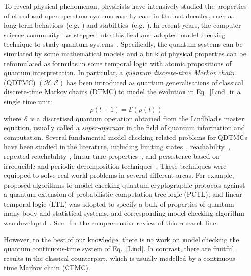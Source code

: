 \documentclass[a4paper,UKenglish,cleveref,autoref,thm-restate,authorcolumns]{lipics-v2019}
\newcommand{\h}{\mathcal{H}}
\newcommand{\e}{\mathrm{e}}
\renewcommand{\e}{\mathcal{E}}
\begin{document}
To reveal physical phenomenon,
physicists have intensively studied the properties of closed and open quantum systems
case by case in the last decades,
such as long-term behaviors~(e.g. \cite{GLT+10})
and stabilities~(e.g. \cite{CiT15}).
In recent years,
the computer science community has stepped into this field
and adopted model checking technique to study quantum systems~\cite{GNP06,GNP08}.
Specifically, the quantum systems can be simulated by some mathematical models
and a bulk of physical properties can be reformulated as formulas
in some temporal logic with atomic propositions of quantum interpretation.
In particular, a \emph{quantum discrete-time Markov chain} (QDTMC) $(\h,\e)$
has been introduced as quantum generalisations of classical discrete-time Markov chains (DTMC)
to model the evolution in Eq.~\eqref{Lind} in a single time unit:
\begin{equation}\label{eq:evolution}
	\rho(t+1)=\e(\rho(t))
\end{equation}
where $\e$ is a discretised quantum operation obtained from the Lindblad's master equation,
usually called a \emph{super-operator} in the field of quantum information and computation.
Several fundamental model checking-related problems
for QDTMCs have been studied in the literature,
including limiting states~\cite{Wol12,GFY18},
reachability~\cite{YFY+13,XHF21},
repeated reachability~\cite{FHT+17},
linear time properties~\cite{LiF15},
and persistence based on irreducible and periodic decomposition techniques~\cite{BaN11,GFY18}.
These techniques were equipped to solve real-world problems in several different areas.
For example, \cite{FYY13} proposed algorithms to
model checking quantum cryptographic protocols
against a quantum extension of probabilistic computation tree logic (PCTL);
and linear temporal logic (LTL) was adopted to
specify a bulk of properties of quantum many-body and statistical systems,
and corresponding model checking algorithm was developed~\cite{GFT+19}.
See~\cite{YiF19,YiF21} for the comprehensive review of this research line. 

However, to the best of our knowledge,
there is no work on model checking the quantum continuous-time system of Eq.~\eqref{Lind}.
In contrast, there are fruitful results in the classical counterpart,
which is usually modelled by a continuous-time Markov chain (CTMC). 
\end{document}

